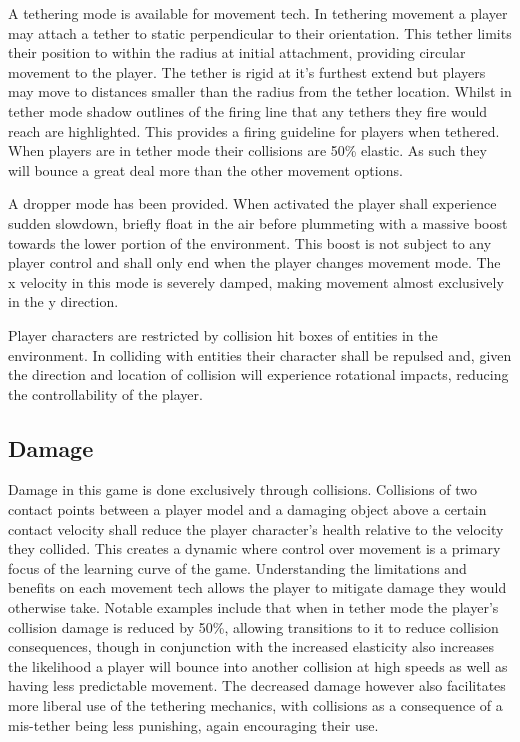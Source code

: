 \documentclass[10pt,a4paper]{article}
\begin{document}
A tethering mode is available for movement tech. In tethering movement a player may attach a tether to static perpendicular to their orientation. This tether limits their position to within the radius at initial attachment, providing circular movement to the player. The tether is rigid at it's furthest extend but players may move to distances smaller than the radius from the tether location. Whilst in tether mode shadow outlines of the firing line that any tethers they fire would reach are highlighted. This provides a firing guideline for players when tethered. When players are in tether mode their collisions are 50\% elastic. As such they will bounce a great deal more than the other movement options.

A dropper mode has been provided. When activated the player shall experience sudden slowdown, briefly float in the air before plummeting with a massive boost towards the lower portion of the environment. This boost is not subject to any player control and shall only end when the player changes movement mode. The x velocity in this mode is severely damped, making movement almost exclusively in the y direction.

Player characters are restricted by collision hit boxes of entities in the environment. In colliding with entities their character shall be repulsed and, given the direction and location of collision will experience rotational impacts, reducing the controllability of the player.

\subsection{Damage}

Damage in this game is done exclusively through collisions. Collisions of two contact points between a player model and a damaging object above a certain contact velocity shall reduce the player character's health relative to the velocity they collided. This creates a dynamic where control over movement is a primary focus of the learning curve of the game. Understanding the limitations and benefits on each movement tech allows the player to mitigate damage they would otherwise take. Notable examples include that when in tether mode the player's collision damage is reduced by 50\%, allowing transitions to it to reduce collision consequences, though in conjunction with the increased elasticity also increases the likelihood a player will bounce into another collision at high speeds as well as having less predictable movement. The decreased damage however also facilitates more liberal use of the tethering mechanics, with collisions as a consequence of a mis-tether being less punishing, again encouraging their use.
\end{document}
